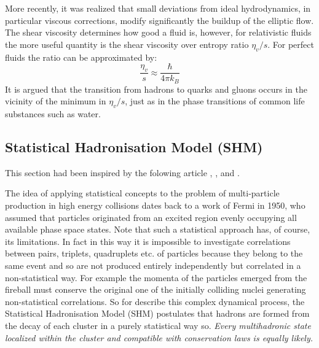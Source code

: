 \documentclass[12pt,a4paper]{book}
\begin{document}
	More recently, it was realized that small deviations from ideal hydrodynamics, in particular viscous corrections, modify significantly the buildup of the elliptic flow. The shear viscosity determines how good a fluid is, however, for relativistic fluids the more useful quantity is the shear viscosity over entropy ratio $\eta_v/s$. For perfect fluids the ratio can be approximated by:
	\begin{equation}
		\frac{\eta_v}{s} \approx \frac{\hbar}{4\pi k_B}
	\end{equation}
	It is argued that the transition from hadrons to quarks and gluons occurs in the vicinity of the minimum in $\eta_v/s$, just as in the phase transitions of common life substances such as water.
	
	
	\subsection{Statistical Hadronisation Model (SHM)}
	This section had been inspired by the folowing article \cite{becattini2009introductionstatisticalhadronizationmodel}, \cite{charm_hierarchy_in_the_statistical_hadronization_model}, \cite{heinz2004conceptsheavyionphysics} and \cite{amsdottorato9036}.
	
	The idea of applying statistical concepts to the problem of multi-particle production in high energy collisions dates back to a work of Fermi in 1950, who assumed that particles originated from an excited region evenly occupying all available phase space states. Note that such a statistical approach has, of course, its limitations. In fact in this way it is impossible to investigate correlations between pairs, triplets, quadruplets etc. of particles because they belong to the same event and so are not produced entirely independently but correlated in a non-statistical way. For example the momenta of the particles emerged from the fireball must conserve the original one of the initially colliding nuclei generating non-statistical correlations. So for describe this complex dynamical process, the Statistical Hadronisation Model (SHM) postulates that hadrons are formed from the decay of each cluster in a purely statistical way so. \textit{Every multihadronic state localized within the cluster and compatible with conservation laws is equally likely.}
	
\end{document}
